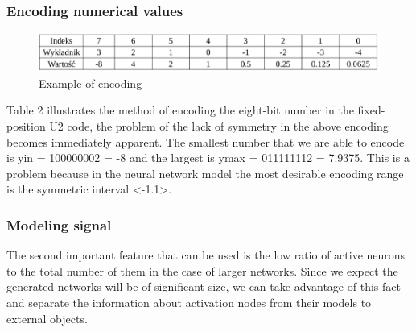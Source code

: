 \documentclass{beamer}
\begin{document}
\begin{frame}
\frametitle{Encoding numerical values}
	\begin{figure}[htb] 
		\includegraphics[width=\textwidth]{figures/u2_example}
		\caption{Example of encoding}
	\end{figure}
	Table 2 illustrates the method of encoding the eight-bit number in the fixed-position U2 code,
	the problem of the lack of symmetry in the above encoding becomes immediately apparent.
	The smallest number that we are able to encode is yin = 100000002 = -8 and the largest is 
	ymax = 011111112 = 7.9375.
	This is a problem because in the neural network model the most desirable encoding range is 
	the symmetric interval <-1.1>. 
\end{frame}

\begin{frame}
\frametitle{Modeling signal}
The second important feature that can be used is the low ratio of active neurons to
the total number of them in the case of larger networks.
Since we expect the generated networks will be of significant size, we can take advantage of this
fact and separate the information about activation nodes from their models to external objects. 
\end{frame}
\end{document}
